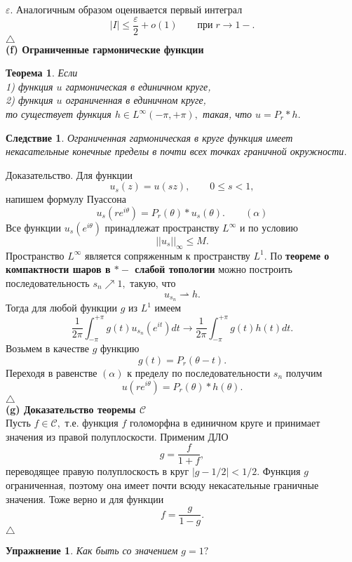 \documentclass[12pt,a4paper]{article}
\theoremstyle{plain}   \newtheorem{Pro}{Задача}
\newtheorem{The}{Теорема}
\newtheorem{Cor}{Следствие}
\newtheorem{Exe}{Упражнение}
\begin{document}
$ \varepsilon . $
Аналогичным образом оценивается первый интеграл
$$
  |I| \leq \frac{\varepsilon }{2} + o (1)
  \qquad при \; r \rightarrow 1- .
$$
$ \triangle $
\\
{\bfseries (f) Ограниченные гармонические функции}
\begin{The}
Если\\
1) функция
$ u $
гармоническая в единичном круге, \\
2) функция
$ u $
ограниченная в единичном круге, \\
то существует функция
$ h \in L^{\infty}(-\pi , +\pi ), $
такая, что
$ u=P_r \ast h . $
\end{The}
\begin{Cor}
Ограниченная гармоническая в круге функция имеет некасательные
конечные пределы в почти всех точках граничной окружности.
\end{Cor}
{\Large Доказательство.}
Для функции
$$
  u_s (z)=u(sz), \qquad 0 \leq s <1,
$$
напишем формулу Пуассона
$$
  u_s (re^{i\theta})=P_r (\theta ) \ast u_s (\theta ).
  \qquad ( \alpha )
$$
Все функции
$ u_s (e^{i\theta} ) $
принадлежат пространству
$ L^{\infty} $
и по условию
$$
  ||u_s ||_{\infty} \leq M.
$$
Пространство
$ L^{\infty} $
является сопряженным к пространству
$ L^1 . $
По
{\bfseries теореме о компактности шаров в
$ \ast - $
слабой топологии}
можно построить последовательность
$ s_n \nearrow 1 , $
такую, что
$$
  u_{s_n} \rightharpoonup h.
$$
Тогда для любой функции
$ g $
из
$ L^1 $
имеем
$$
  \frac{1}{2\pi}\int _{-\pi}^{+\pi}
  g(t)u_{s_n}(e^{it})dt \longrightarrow
  \frac{1}{2\pi}\int _{-\pi}^{+\pi}
  g(t)h(t)dt.
$$
Возьмем в качестве
$ g $
функцию
$$
  g(t)=P_r (\theta -t).
$$
Переходя в равенстве
$ (\alpha ) $
к пределу по последовательности
$ s_n $
получим
$$
  u(re^{i\theta})=P_r (\theta ) \ast h(\theta ).
$$
$ \triangle $
\\
{\bfseries (g) Доказательство теоремы
$ \mathcal{C} $ }
\\
Пусть
$ f \in \mathcal{C} , $
т.е. функция
$ f $
голоморфна в единичном круге и принимает значения из
правой полуплоскости. Применим ДЛО
$$
  g=\frac{f}{1+f},
$$
переводящее правую полуплоскость в круг
$ |g-1/2|<1/2. $
Функция
$ g $
ограниченная, поэтому она имеет почти всюду некасательные
граничные значения. Тоже верно и для функции
$$
  f=\frac{g}{1-g}.
$$
$ \triangle $
\begin{Exe}
Как быть со значением
$ g=1 ? $
\end{Exe}
\newpage
\end{document}
